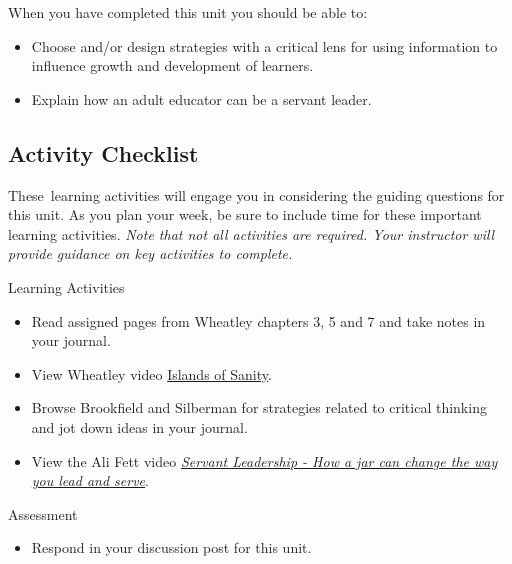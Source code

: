 \documentclass[
]{book}
\providecommand{\tightlist}{%
  \setlength{\itemsep}{0pt}\setlength{\parskip}{0pt}}
\begin{document}
When you have completed this unit you should be able to:

\begin{itemize}
\tightlist
\item
  Choose and/or design strategies with a critical lens for using information to influence growth and development of learners.\\
\item
  Explain how an adult educator can be a servant leader.
\end{itemize}

\hypertarget{activity-checklist-6}{%
\subsection*{Activity Checklist}\label{activity-checklist-6}}

These~learning activities will engage you in considering the guiding questions for this unit. As you plan your week, be sure to include time for these important learning activities. \emph{Note that not all activities are required. Your instructor will provide guidance on key activities to complete.}

\begin{reflect}
{Learning Activities}

\begin{itemize}
\tightlist
\item
  Read assigned pages from Wheatley chapters 3, 5 and 7 and take notes in your journal.\\
\item
  View Wheatley video \href{https://youtu.be/LtaYNxp56gs}{Islands of Sanity}.\\
\item
  Browse Brookfield and Silberman for strategies related to critical thinking and jot down ideas in your journal.\\
\item
  View the Ali Fett video \href{https://youtu.be/1vIPrR_clEg}{\emph{Servant Leadership - How a jar can change the way you lead and serve}}.
\end{itemize}
\end{reflect}

\begin{assessment}
{Assessment}

\begin{itemize}
\tightlist
\item
  Respond in your discussion post for this unit.
\end{itemize}
\end{assessment}
\end{document}
